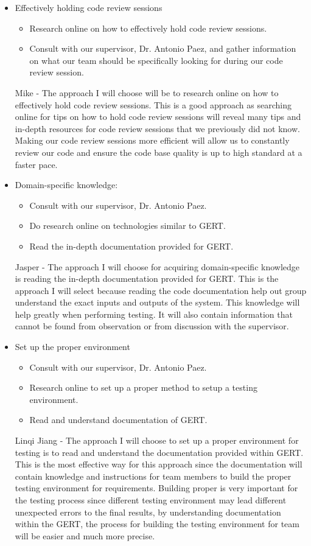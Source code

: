 \documentclass[12pt, titlepage]{article}
\begin{document}
\begin{itemize}
    \item Effectively holding code review sessions
    \begin{itemize}
        \item Research online on how to effectively hold code review sessions.
        \item Consult with our supervisor, Dr. Antonio Paez, and gather information on what our team should be specifically looking for during our code review session.
    \end{itemize}
    Mike - The approach I will choose will be to research online on how to effectively hold code review sessions. This is a good approach as searching online for tips on how to hold code review sessions will reveal many tips and in-depth resources for code review sessions that we previously did not know. Making our code review sessions more efficient will allow us to constantly review our code and ensure the code base quality is up to high standard at a faster pace.
    \item Domain-specific knowledge:
    \begin{itemize}
        \item Consult with our supervisor, Dr. Antonio Paez.
        \item Do research online on technologies similar to GERT.
        \item Read the in-depth documentation provided for GERT.
    \end{itemize}
    Jasper - The approach I will choose for acquiring domain-specific knowledge is reading the in-depth documentation provided for GERT. This is the approach I will select because reading the code documentation help out group understand the exact inputs and outputs of the system. This knowledge will help greatly when performing testing. It will also contain information that cannot be found from observation or from discussion with the supervisor.
    \item Set up the proper environment
    \begin{itemize}
        \item Consult with our supervisor, Dr. Antonio Paez.
        \item Research online to set up a proper method to setup a testing environment.
        \item Read and understand documentation of GERT.
    \end{itemize}
    Linqi Jiang - The approach I will choose to set up a proper environment for testing is to read and understand the documentation provided within GERT. This is the most effective way for this approach since the documentation will contain knowledge and instructions for team members to build the proper testing environment for requirements. Building proper is very important for the testing process since different testing environment may lead different unexpected errors to the final results, by understanding documentation within the GERT, the process for building the testing environment for team will be easier and much more precise.
\end{itemize}
\end{document}
